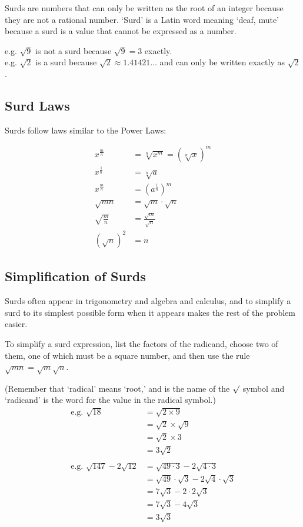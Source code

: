 \documentclass{article}
\begin{document}
Surds are numbers that can only be written as the root of an integer because they are not a rational number. ‘Surd’ is a Latin word meaning ‘deaf, mute’ because a surd is a value that cannot be expressed as a number.

e.g. $\sqrt{9}$ is not a surd because $\sqrt{9}=3$ exactly.\\
\indent e.g. $\sqrt{2}$ is a surd because $\sqrt{2}\approx 1.41421\ldots$ and can only be written exactly as $\sqrt{2}$.

\subsection{Surd Laws}
Surds follow laws similar to the Power Laws:
\begin{Large}
\begin{align*}
x^{\frac{m}{n}}&=\sqrt[n]{x^m}=(\sqrt[n]{x})^m\\
x^{\frac{1}{n}}&=\sqrt[n]{a}\\
x^{\frac{m}{n}}&=(a^{\frac{1}{n}})^m\\
\sqrt{ mn}&=\sqrt{m} \cdot \sqrt{n}\\
\sqrt{\frac{m}{n}}&=\frac{\sqrt{m}}{\sqrt{n}}\\
(\sqrt{n})^2&=n
\end{align*}
\end{Large}

\subsection{Simplification of Surds}
Surds often appear in trigonometry and algebra and calculus, and to simplify a surd to its simplest possible form when it appears makes the rest of the problem easier.

To simplify a surd expression, list the factors of the radicand, choose two of them, one of which must be a square number, and then use the rule $\sqrt{mn}=\sqrt{m}\sqrt{n}$.

(Remember that ‘radical’ means ‘root,’ and is the name of the $\surd$ symbol and ‘radicand’ is the word for the value in the radical symbol.)
\begin{align*}
\text{e.g. }
\sqrt{18}
&=\sqrt{2 \times 9}\\
&=\sqrt{2} \times \sqrt{9}\\
&=\sqrt{2} \times 3\\
&=3\sqrt{2}\\
\\
\text{e.g. }
\sqrt{147}-2\sqrt{12}
&=\sqrt{49 \cdot 3}-2\sqrt{4 \cdot 3}\\
&=\sqrt{49} \cdot \sqrt{3}-2\sqrt{4} \cdot \sqrt{3}\\
&=7\sqrt{3}-2 \cdot 2\sqrt{3}\\
&=7\sqrt{3}-4\sqrt{3}\\
&=3\sqrt{3}
\end{align*}
\end{document}
